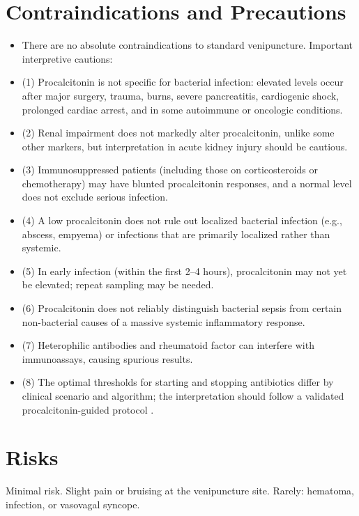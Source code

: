 \section*{Contraindications and Precautions}
\begin{itemize}
  \item There are no absolute contraindications to standard venipuncture. Important interpretive cautions:
  \item (1) Procalcitonin is not specific for bacterial infection: elevated levels occur after major surgery, trauma, burns, severe pancreatitis, cardiogenic shock, prolonged cardiac arrest, and in some autoimmune or oncologic conditions.
  \item (2) Renal impairment does not markedly alter procalcitonin, unlike some other markers, but interpretation in acute kidney injury should be cautious.
  \item (3) Immunosuppressed patients (including those on corticosteroids or chemotherapy) may have blunted procalcitonin responses, and a normal level does not exclude serious infection.
  \item (4) A low procalcitonin does not rule out localized bacterial infection (e.g., abscess, empyema) or infections that are primarily localized rather than systemic.
  \item (5) In early infection (within the first 2--4 hours), procalcitonin may not yet be elevated; repeat sampling may be needed.
  \item (6) Procalcitonin does not reliably distinguish bacterial sepsis from certain non-bacterial causes of a massive systemic inflammatory response.
  \item (7) Heterophilic antibodies and rheumatoid factor can interfere with immunoassays, causing spurious results.
  \item (8) The optimal thresholds for starting and stopping antibiotics differ by clinical scenario and algorithm; the interpretation should follow a validated procalcitonin-guided protocol \cite{schuetz2011procalcitonin}.
\end{itemize}
\section*{Risks}
Minimal risk. Slight pain or bruising at the venipuncture site. Rarely: hematoma, infection, or vasovagal syncope.


